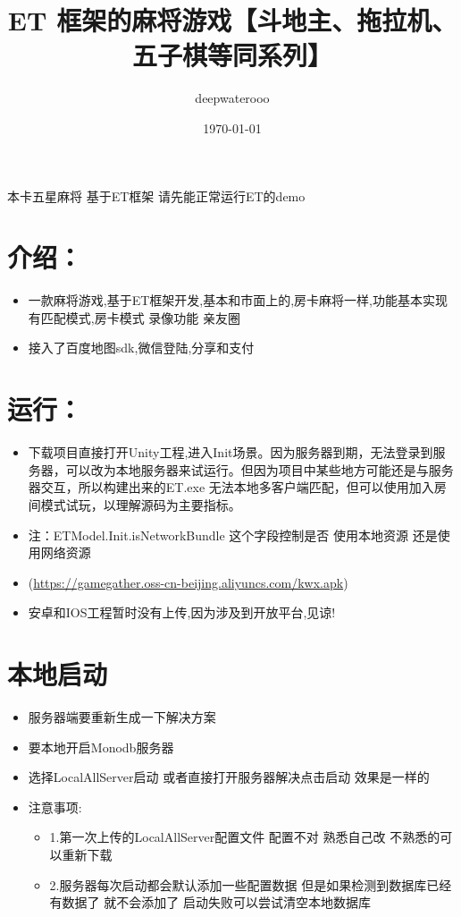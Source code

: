 \documentclass[9pt, b5paper]{article}
\author{deepwaterooo}
\date{\today}
\title{ET 框架的麻将游戏【斗地主、拖拉机、五子棋等同系列】}
\begin{document}
\maketitle
\tableofcontents

本卡五星麻将 基于ET框架 请先能正常运行ET的demo  

\section{介绍：}
\label{sec:org6f91930}
\begin{itemize}
\item 一款麻将游戏,基于ET框架开发,基本和市面上的,房卡麻将一样,功能基本实现 有匹配模式,房卡模式 录像功能 亲友圈
\item 接入了百度地图sdk,微信登陆,分享和支付
\end{itemize}

\section{运行：}
\label{sec:orgfc0627b}
\begin{itemize}
\item 下载项目直接打开Unity工程,进入Init场景。因为服务器到期，无法登录到服务器，可以改为本地服务器来试运行。但因为项目中某些地方可能还是与服务器交互，所以构建出来的ET.exe 无法本地多客户端匹配，但可以使用加入房间模式试玩，以理解源码为主要指标。
\item 注：ETModel.Init.isNetworkBundle 这个字段控制是否 使用本地资源 还是使用网络资源
\item\relax [打好包apk下载](\url{https://gamegather.oss-cn-beijing.aliyuncs.com/kwx.apk})
\item 安卓和IOS工程暂时没有上传,因为涉及到开放平台,见谅!
\end{itemize}

\section{本地启动}
\label{sec:orgb92425b}
\begin{itemize}
\item 服务器端要重新生成一下解决方案
\item 要本地开启Monodb服务器
\item 选择LocalAllServer启动 或者直接打开服务器解决点击启动 效果是一样的

\item 注意事项:  
\begin{itemize}
\item 1.第一次上传的LocalAllServer配置文件 配置不对 熟悉自己改 不熟悉的可以重新下载
\item 2.服务器每次启动都会默认添加一些配置数据 但是如果检测到数据库已经有数据了 就不会添加了 启动失败可以尝试清空本地数据库
\end{itemize}
\end{itemize}
\end{document}
